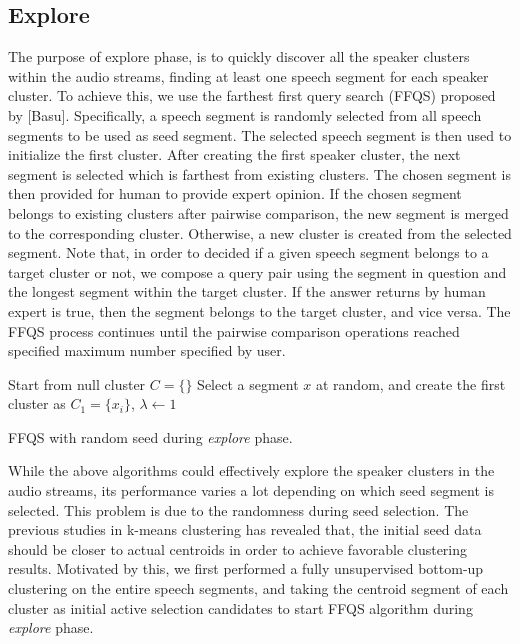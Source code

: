\documentclass[final,authoryear,5p,times,twocolumn]{elsarticle}
\begin{document}
\subsection{Explore}
The purpose of explore phase, is to quickly discover all the speaker clusters within the audio streams, finding at least one speech segment for each speaker cluster. To achieve this, we use the farthest first query search (FFQS) proposed by [Basu]. Specifically, a speech segment is randomly selected from all speech segments to be used as seed segment. The selected speech segment is then used to initialize the first cluster. After creating the first speaker cluster, the next segment is selected which is farthest from existing clusters. The chosen segment is then provided for human to provide expert opinion. If the chosen segment belongs to existing clusters after pairwise comparison, the new segment is merged to the corresponding cluster. Otherwise, a new cluster is created from the selected segment. Note that, in order to decided if a given speech segment belongs to a target cluster or not, we compose a query pair using the segment in question and the longest segment within the target cluster. If the answer returns by human expert is true, then the segment belongs to the target cluster, and vice versa. The FFQS process continues until the pairwise comparison operations reached specified maximum number specified by user.   
 
\begin{algorithm}
	Start from null cluster $C= \{\}$\;
	Select a segment $x$ at random, and create the first cluster as $C_1 = \{x_i\}$, $\lambda \leftarrow 1$\; 
	\caption{FFQS with random seed during \textit{explore} phase.}
\end{algorithm}
 
While the above algorithms could effectively explore the speaker clusters in the audio streams, its performance varies a lot depending on which seed segment is selected. This problem is due to the randomness during seed selection. The previous studies in k-means clustering has revealed that, the initial seed data should be closer to actual centroids in order to achieve favorable clustering results. Motivated by this, we first performed a fully unsupervised bottom-up clustering on the entire speech segments, and taking the centroid segment of each cluster as initial active selection candidates to start FFQS algorithm during \textit{explore} phase.
\end{document}
